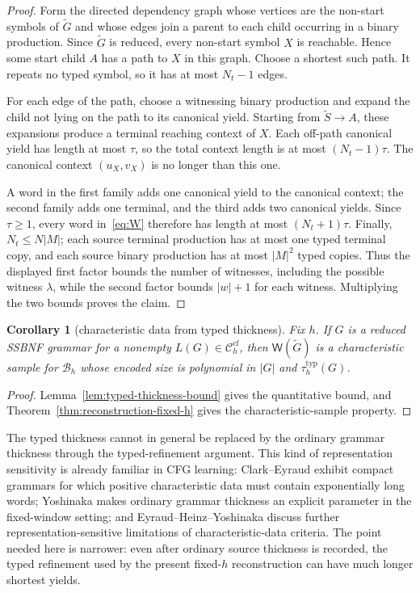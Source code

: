 \documentclass[11pt,a4paper]{article}
\newtheorem{corollary}[theorem]{Corollary}
\theoremstyle{remark}
\theoremstyle{plain}
\newcommand{\WitnessSet}{\mathsf{W}}
\newcommand{\cf}{\mathrm{cf}}
\newcommand{\Ccf}[1]{\mathcal C_{#1}^{\cf}}
\begin{document}
\begin{proof}
Form the directed dependency graph whose vertices are the non-start symbols of
$\widetilde G$ and whose edges join a parent to each child occurring in a
binary production.  Since $\widetilde G$ is reduced, every non-start symbol
$X$ is reachable.  Hence some start child $A$ has a path to $X$ in this
graph.  Choose a shortest such path.  It repeats no typed symbol, so it has at
most $N_t-1$ edges.

For each edge of the path, choose a witnessing binary production and expand
the child not lying on the path to its canonical yield.  Starting from
$\widetilde S\to A$, these expansions produce a terminal reaching context of
$X$.  Each off-path canonical yield has length at most $\tau$, so the total
context length is at most $(N_t-1)\tau$.  The canonical context
$(u_X,v_X)$ is no longer than this one.

A word in the first family adds one canonical yield to the canonical context;
the second family adds one terminal, and the third adds two canonical yields.
Since $\tau\ge1$, every word in~\eqref{eq:W} therefore has length at most
$(N_t+1)\tau$.  Finally, $N_t\le N|M|$; each source terminal production has
at most one typed terminal copy, and each source binary production has at
most $|M|^2$ typed copies.  Thus the displayed first factor bounds the number
of witnesses, including the possible witness $\lambda$, while the second
factor bounds $|w|+1$ for each witness.  Multiplying the two bounds proves the
claim.
\end{proof}

\begin{corollary}[characteristic data from typed thickness]
\label{cor:typed-thickness-data}
Fix $h$.  If $G$ is a reduced SSBNF grammar for a nonempty
$L(G)\in\Ccf{h}$, then $\WitnessSet(\widetilde G)$ is a characteristic
sample for $\mathcal B_h$ whose encoded size is polynomial in
$|G|$ and $\tau_h^{\mathrm{typ}}(G)$.
\end{corollary}

\begin{proof}
Lemma~\ref{lem:typed-thickness-bound} gives the quantitative bound, and
Theorem~\ref{thm:reconstruction-fixed-h} gives the characteristic-sample property.
\end{proof}

The typed thickness cannot in general be replaced by the ordinary grammar
thickness through the typed-refinement argument.  This kind of representation
sensitivity is already familiar in CFG learning: Clark--Eyraud
\cite[Example~2]{clark-eyraud2007} exhibit compact grammars for which positive
characteristic data must contain exponentially long words; Yoshinaka
\cite{yoshinaka2008} makes ordinary grammar thickness an explicit parameter in
the fixed-window setting; and Eyraud--Heinz--Yoshinaka
\cite{eyraud-heinz-yoshinaka2016} discuss further representation-sensitive
limitations of characteristic-data criteria.  The point needed here is
narrower: even after ordinary source thickness is recorded, the typed
refinement used by the present fixed-$h$ reconstruction can have much longer
shortest yields.
\end{document}
